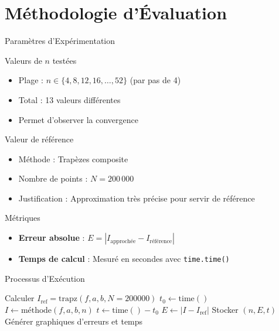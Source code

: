 \documentclass[aspectratio=169,11pt]{beamer}
\begin{document}
\section{Méthodologie d'Évaluation}

\begin{frame}{Paramètres d'Expérimentation}
\vspace{-0.2cm}
\begin{block}{Valeurs de $n$ testées}
\small
\begin{itemize}
\item Plage : $n \in \{4, 8, 12, 16, \ldots, 52\}$ (par pas de 4)
\item Total : 13 valeurs différentes
\item Permet d'observer la convergence
\end{itemize}
\end{block}

\vspace{-0.15cm}
\begin{block}{Valeur de référence}
\small
\begin{itemize}
\item Méthode : Trapèzes composite
\item Nombre de points : $N = 200\,000$
\item Justification : Approximation très précise pour servir de référence
\end{itemize}
\end{block}

\vspace{-0.15cm}
\begin{block}{Métriques}
\small
\begin{itemize}
\item \textbf{Erreur absolue} : $E = |I_{\text{approchée}} - I_{\text{référence}}|$
\item \textbf{Temps de calcul} : Mesuré en secondes avec \texttt{time.time()}
\end{itemize}
\end{block}
\end{frame}

\begin{frame}{Processus d'Exécution}
\vspace{-0.3cm}
\begin{algorithm}[H]
\caption{Processus d'Évaluation}
\small
\begin{algorithmic}[1]
    \STATE Calculer $I_{\text{ref}} = \text{trapz}(f, a, b, N=200000)$
            \STATE $t_0 \leftarrow \text{time}()$
            \STATE $I \leftarrow \text{méthode}(f, a, b, n)$
            \STATE $t \leftarrow \text{time}() - t_0$
            \STATE $E \leftarrow |I - I_{\text{ref}}|$
            \STATE Stocker $(n, E, t)$
        \ENDFOR
    \ENDFOR
    \STATE Générer graphiques d'erreurs et temps
\ENDFOR
\end{algorithmic}
\end{algorithm}
\end{frame}
\end{document}
